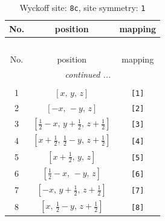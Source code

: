 \documentclass[fleqn,8pt]{jsarticle}
\begin{document}
\renewcommand{\arraystretch}{1.2}
\begin{longtable}{ccc}
\caption{Wyckoff site: {\tt 8c}, site symmetry: {\tt 1}}
 \\
 \hline \hline
No. & position & mapping \\ \hline \endfirsthead

\multicolumn{2}{l}{\tablename\ \thetable{}} \\
 \hline \hline
No. & position & mapping \\ \hline \endhead

 \hline \hline
\multicolumn{2}{r}{\footnotesize\it continued ...} \\ \endfoot

 \hline \hline
\multicolumn{2}{r}{} \\ \endlastfoot

1 & $\left[ x,\, y,\, z \right]$ & {\tt [1]} \\ \hline
2 & $\left[ - x,\, - y,\, z \right]$ & {\tt [2]} \\ \hline
3 & $\left[ \frac{1}{2} - x,\, y + \frac{1}{2},\, z + \frac{1}{2} \right]$ & {\tt [3]} \\ \hline
4 & $\left[ x + \frac{1}{2},\, \frac{1}{2} - y,\, z + \frac{1}{2} \right]$ & {\tt [4]} \\ \hline
5 & $\left[ x + \frac{1}{2},\, y,\, z \right]$ & {\tt [5]} \\ \hline
6 & $\left[ \frac{1}{2} - x,\, - y,\, z \right]$ & {\tt [6]} \\ \hline
7 & $\left[ - x,\, y + \frac{1}{2},\, z + \frac{1}{2} \right]$ & {\tt [7]} \\ \hline
8 & $\left[ x,\, \frac{1}{2} - y,\, z + \frac{1}{2} \right]$ & {\tt [8]} \\
\end{longtable}
\end{document}
